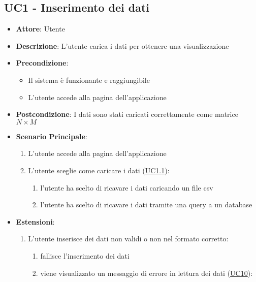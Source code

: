\subsection{UC1 - Inserimento dei dati }
\label{uc1}

    \begin{itemize}
    \item \textbf{Attore}: Utente
    \item \textbf{Descrizione}: L'utente carica i dati per ottenere una visualizzazione
    \item \textbf{Precondizione}:
    \begin{itemize}
        \item Il sistema è funzionante e raggiungibile
        \item L'utente accede alla pagina dell'applicazione
    \end{itemize}
    \item \textbf{Postcondizione}: I dati sono stati caricati correttamente come matrice $N\times M$
    \item \textbf{Scenario Principale}: 
        \begin{enumerate}
            \item L'utente accede alla pagina dell'applicazione
            \item L'utente sceglie come caricare i dati (\hyperref[uc1.1]{UC1.1}):
                \begin{enumerate}
                    \item l'utente ha scelto di ricavare i dati caricando un file csv
                    \item l'utente ha scelto di ricavare i dati tramite una query a un database
                \end{enumerate}
        \end{enumerate}  
    \item \textbf{Estensioni}:
        \begin{enumerate}
            \item L'utente inserisce dei dati non validi o non nel formato corretto:
                \begin{enumerate}
                    \item fallisce l'inserimento dei dati
                    \item viene visualizzato un messaggio di errore in lettura dei dati (\hyperref[uc10]{UC10}):
                \end{enumerate}
        \end{enumerate}  

\end{itemize}
